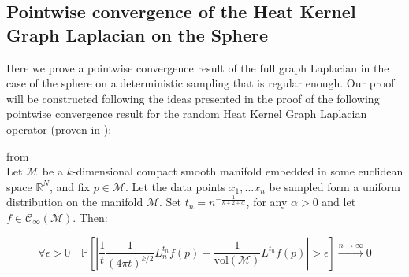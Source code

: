 \subsection{Pointwise convergence of the Heat Kernel Graph Laplacian on the Sphere}
\label{sec:Chapter2:pointwise convergence of the Heat Kernel Graph Laplacian on the Sphere}
Here we prove a pointwise convergence result of the full graph Laplacian in the case of the sphere on a deterministic sampling that is regular enough. Our proof will be constructed following the ideas presented in the proof of the following pointwise convergence result for the random Heat Kernel Graph Laplacian operator (proven in \cite{Belkin:2005:TTF:2138147.2138189}):
\vspace{0.5cm}
\begin{theorem}{from \cite[Belkin et al.]{Belkin:2005:TTF:2138147.2138189}}\\
	\label{theo:Belkin pointwise convergence}
	Let $\mathcal M$ be a $k$-dimensional compact smooth manifold embedded in some euclidean space $\mathbb R^N$, and fix $p\in\mathcal M$. Let the data points $x_1, ... x_n$ be sampled form a uniform distribution on the manifold $\mathcal M$. Set $t_n=n^{-\frac{1}{k+2+\alpha}}$, for any $\alpha>0$ and let $f\in\mathcal C_\infty(\mathcal M)$. Then:
	
	$$\forall \epsilon>0\quad \mathbb{P}\left[\left|\frac{1}{t}\frac{1}{(4 \pi t)^{k/2}}L_{n}^{t_n} f(p)-  \frac{1}{\text{vol}(\mathcal M)}L^{t_n} f(p)\right|>\epsilon\right] \xrightarrow{n\to\infty} 0$$
\end{theorem}
\vspace{0.5cm}

